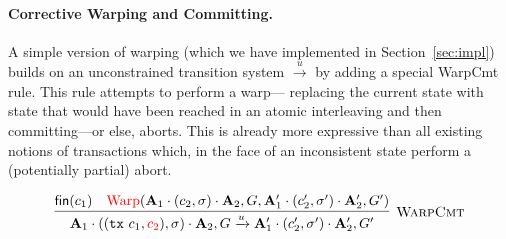 
\paragraph{Corrective Warping and Committing.}
A simple version of warping (which we have implemented in
Section~\ref{sec:impl}) builds on an unconstrained transition system
$\xrightarrow{u}$ by adding a special {\sc WarpCmt} rule. This rule
attempts to perform a warp---
replacing the current state with state that would have been reached in
an atomic interleaving and then committing---or else, aborts. This is
already more expressive than all existing notions of transactions
which, in the face of an inconsistent state perform a (potentially
partial) abort.


$$
\infer[\text{\sc WarpCmt}]{ 
  \As_1 \cdot ((\tx{c_1},\red{c_2}),\sigma) \cdot \As_2, G  \xrightarrow{u}
  \As'_1 \cdot (c'_2,\sigma') \cdot \As'_2, G'
}{
  \nothing{c_1} &
   \text{\red{Warp}}(  \As_1 \cdot (c_2,\sigma) \cdot \As_2, G,
  \As'_1 \cdot (c'_2,\sigma') \cdot \As'_2, G')
}
$$





\bigskip
\bigskip
\bigskip
\bigskip
\bigskip
\bigskip
\bigskip
\bigskip









